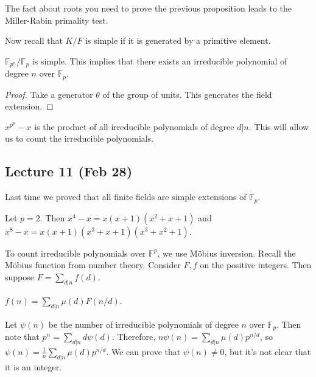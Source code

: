 \documentclass[10pt, twoside]{article}
\newcommand{\F}{\mathbb{F}}
\begin{document}
        \begin{rmk}
            The fact about roots you need to prove the previous proposition leads to the Miller-Rabin primality test.
        \end{rmk}

        Now recall that $K/F$ is simple if it is generated by a primitive element.

        \begin{cor}
            $\F_{p^n}/\F_p$ is simple. This implies that there exists an irreducible polynomial of degree $n$ over $\F_p$.
            \begin{proof}
                Take a generator $\theta$ of the group of units. This generates the field extension.
            \end{proof}
        \end{cor}

        \begin{rmk}
            $x^{p^n} - x$ is the product of all irreducible polynomials of degree $d | n$. This will allow us to count the irreducible polynomials.
        \end{rmk}

        \subsection{Lecture 11 (Feb 28)}
        
        Last time we proved that all finite fields are simple extensions of $\F_p$. 

        \begin{exm}
            Let $p = 2$. Then $x^4-x = x(x+1)(x^2+x+1)$ and $x^8-x = x(x+1)(x^3+x+1)(x^3+x^2+1)$.
        \end{exm}

        To count irreducible polynomials over $\F^p$, we use M\"obius inversion. Recall the M\"obius function from number theory. Consider $F,f$ on the positive integers. Then suppose $F = \sum_{d|n} f(d)$.

        \begin{thm}
            $f(n) = \sum_{d|n} \mu(d)F(n/d)$. 
        \end{thm}

        Let $\psi(n)$ be the number of irreducible polynomials of degree $n$ over $\F_p$. Then note that $p^n = \sum_{d|n} d\psi(d)$. Therefore, $n\psi(n) = \sum_{d|n}\mu(d)p^{n/d}$, so $\psi(n) = \frac{1}{n} \sum_{d|n} \mu(d)p^{n/d}$. We can prove that $\psi(n) \neq 0$, but it's not clear that it is an integer.
\end{document}
